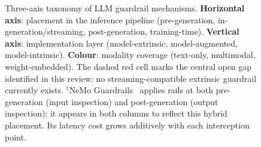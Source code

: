 \begin{figure}[!htbp]
{%
}%
\caption{%
  Three-axis taxonomy of LLM guardrail mechanisms.
  \textbf{Horizontal axis}: placement in the inference pipeline
  (pre-generation, in-generation/streaming, post-generation, training-time).
  \textbf{Vertical axis}: implementation layer
  (model-extrinsic, model-augmented, model-intrinsic).
  \textbf{Colour}: modality coverage
  (\textcolor{blue!70}{text-only}, \textcolor{orange!80!black}{multimodal}, \textcolor{green!50!black}{weight-embedded}).
  The dashed red cell marks the central open gap identified in this review:
  no streaming-compatible extrinsic guardrail currently exists.
  $^\dagger$NeMo Guardrails~\cite{rebedea2023nemo} applies rails at both
  pre-generation (input inspection) and post-generation (output inspection);
  it appears in both columns to reflect this hybrid placement.
  Its latency cost grows additively with each interception point.
}
\label{fig:sota_taxonomy}
\end{figure}
